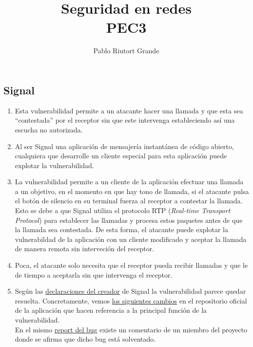 \documentclass[10pt,a4paper]{article}
\author{Pablo Riutort Grande}
\title{Seguridad en redes\\ \vspace{1cm}\textbf{PEC3}}
\begin{document}
\maketitle
\pagebreak
\section{}
\subsection{Signal}
\begin{enumerate}
\item Esta vulnerabilidad permite a un atacante hacer una llamada y que esta sea ``contestada'' por el receptor sin que este intervenga estableciendo así una escucha no autorizada.
\item Al ser Signal una aplicación de mensajería instantánea de código abierto, cualquiera que desarrolle un cliente especial para esta aplicación puede explotar la vulnerabilidad.
\item La vulnerabilidad permite a un cliente de la aplicación efectuar una llamada a un objetivo, en el momento en que hay tono de llamada, si el atacante pulsa el botón de silencio en su terminal fuerza al receptor a contestar la llamada. Esto se debe a que Signal utiliza el protocolo RTP (\textit{Real-time Transport Protocol}) para establecer las llamadas y procesa estos paquetes antes de que la llamada sea contestada. De esta forma, el atacante puede explotar la vulnerabildad de la aplicación con un cliente modificado y aceptar la llamada de manera remota sin interveción del receptor.
\item Poca, el atacante solo necesita que el receptor pueda recibir llamadas y que le de tiempo a aceptarla sin que intervenga el receptor.
\item Según las \href{https://twitter.com/moxie/status/1180261210341511168}{declaraciones del creador} de Signal la vulnerabilidad parece quedar resuelta. Concretamente, vemos \href{https://github.com/signalapp/Signal-Android/commit/8f8f41f18432bf97a207883b24cd04fb2f8e04c6}{los siguientes cambios} en el repositorio oficial de la aplicación que hacen referencia a la principal función de la vulnerabilidad.\\
En el mismo \href{https://bugs.chromium.org/p/project-zero/issues/detail?id=1943}{report del bug} existe un comentario de un miembro del proyecto donde se afirma que dicho bug está solventado.
\end{enumerate}
\end{document}
